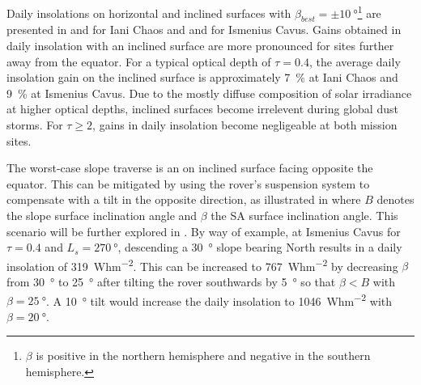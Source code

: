 \vspace{0.5cm}

Daily insolations on horizontal and inclined surfaces with $\beta_{best}=\pm\SI{10}{\degree}$\footnote{$\beta$ is positive in the northern hemisphere and negative in the southern hemisphere.} are presented in  and  for Iani Chaos and  and  for Ismenius Cavus. Gains obtained in daily insolation with an inclined surface are more pronounced for sites further away from the equator. For a typical optical depth of $\tau = 0.4$, the average daily insolation gain on the inclined surface is approximately \SI{7}{\percent} at Iani Chaos and \SI{9}{\percent} at Ismenius Cavus.
Due to the mostly diffuse composition of solar irradiance at higher optical depths, inclined surfaces become irrelevent during global dust storms. For $\tau \geq 2$, gains in daily insolation become negligeable at both mission sites.



\vspace{0.5cm}



\vspace{0.5cm}



\vspace{0.5cm}



The worst-case slope traverse is an on inclined surface facing opposite the equator. This can be mitigated by using the rover's suspension system to compensate with a tilt in the opposite direction, as illustrated in  where $B$ denotes the slope surface inclination angle and $\beta$ the \ac{SA} surface inclination angle. This scenario will be further explored in . By way of example, at Ismenius Cavus for $\tau = 0.4$ and $L_{s}=\SI{270}{\degree}$, descending a \SI{30}{\degree} slope bearing North results in a daily insolation of \SI{319}{Whm^{-2}}. This can be increased to \SI{767}{Whm^{-2}} by decreasing $\beta$ from \SI{30}{\degree} to \SI{25}{\degree} after tilting the rover southwards by \SI{5}{\degree} so that $\beta < B$ with $\beta = \SI{25}{\degree}$. A \SI{10}{\degree} tilt would increase the daily insolation to \SI{1046}{Whm^{-2}} with $\beta = \SI{20}{\degree}$.


